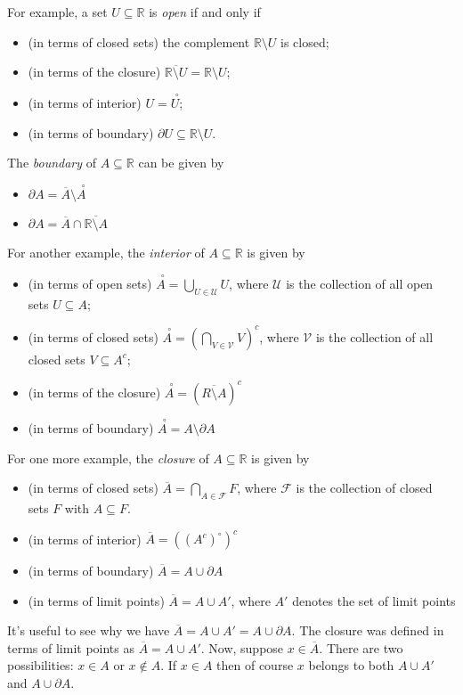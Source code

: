 \documentclass[12pt,letterpaper]{article}
\newcommand{\R}{\mathbb{R}}
\newcommand{\inter}[1]{\overset{\,\,\,\circ}{#1}}
\begin{document}
For example, a set $U\subseteq \R$ is {\em open} if and only if
\begin{itemize}
 \item (in terms of closed sets) the complement $\R\setminus U$ is closed;
 \item (in terms of the closure) $\overline{\R\setminus U} = \R\setminus U$;
 \item (in terms of interior) $U=\inter{U}$;
 \item (in terms of boundary) $\partial U \subseteq \R\setminus U$.
\end{itemize}
The {\em boundary} of $A\subseteq \R$ can be given by
\begin{itemize}
 \item $\partial A = \overline{A}\setminus \inter{A}$
 \item $\partial A = \overline{A}\cap \overline{\R\setminus A}$
\end{itemize}
For another example, the {\em interior} of $A\subseteq \R$ is given by
\begin{itemize}
 \item (in terms of open sets) $\inter{A} = \bigcup_{U\in\mathcal{U}}U$, where $\mathcal{U}$ is the collection of all open sets $U\subseteq A$;
 \item (in terms of closed sets) $\inter{A} = \left(\bigcap_{V\in\mathcal{V}}V\right)^c$, where $\mathcal{V}$ is the collection of all closed sets $V\subseteq A^c$;
 \item (in terms of the closure) $\inter{A} = \left(\overline{R\setminus A}\right)^c$
 \item (in terms of boundary) $\inter{A} = A\setminus \partial A$
\end{itemize}
For one more example, the {\em closure} of $A\subseteq \R$ is given by
\begin{itemize}
 \item (in terms of closed sets) $\overline{A} = \bigcap_{A\in\mathcal{F}}F$, where $\mathcal{F}$ is the collection of closed sets $F$ with $A\subseteq F$.
 \item (in terms of interior) $\overline{A} = ((A^c)^\circ)^c$
 \item (in terms of boundary) $\overline{A} = A\cup\partial A$
 \item (in terms of limit points) $\overline{A} = A\cup A'$, where $A'$ denotes the set of limit points
\end{itemize}
It's useful to see why we have $\overline{A} = A\cup A' = A\cup \partial A$. The closure was defined in terms of limit points as $\overline{A} = A\cup A'$. Now, suppose $x\in \overline{A}$. There are two possibilities: $x\in A$ or $x\notin A$. If $x\in A$ then of course $x$ belongs to both $A\cup A'$ and $A\cup \partial A$.
\end{document}
